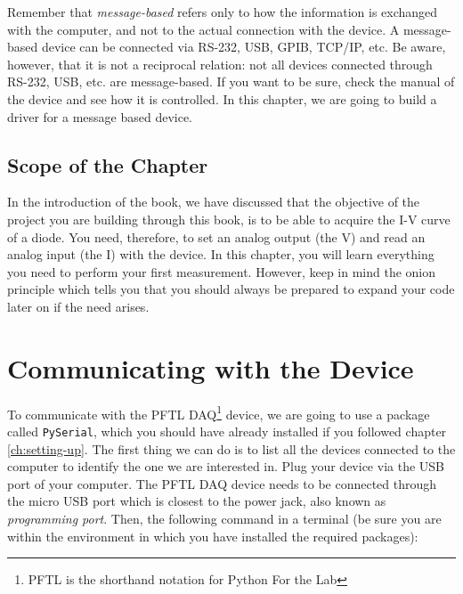 
Remember that \textit{message-based} refers only to how the information is exchanged with the computer, and not to the actual connection with the device. A message-based device can be connected via RS-232, USB, GPIB, TCP/IP, etc. Be aware, however, that it is not a reciprocal relation: not all devices connected through RS-232, USB, etc. are message-based. If you want to be sure, check the manual of the device and see how it is controlled. In this chapter, we are going to build a driver for a message based device.

\subsection{Scope of the Chapter}
In the introduction of the book, we have discussed that the objective of the project you are building through this book, is to be able to acquire the I-V curve of a diode. You need, therefore, to set an analog output (the V) and read an analog input (the I) with the device. In this chapter, you
will learn everything you need to perform your first measurement. However, keep in mind the onion principle which tells you that you should always be prepared to expand your code later on if the need arises.

\section{Communicating with the Device}\label{message-basedevices}
To communicate with the {PFTL DAQ}\footnote{PFTL is the shorthand notation for Python For the Lab} device, we are going to use a package called \texttt{PySerial}, which you should have already installed if you followed chapter \ref{ch:setting-up}. The first thing we can do is to list all the devices connected to the computer to identify the one we are interested in. Plug your device via the USB port of your computer. The {PFTL DAQ} device needs to be connected through the micro USB port which is closest to the power jack, also known as \emph{programming port}. Then, the following command in a terminal (be sure you are within the environment in which you have installed the required packages):


